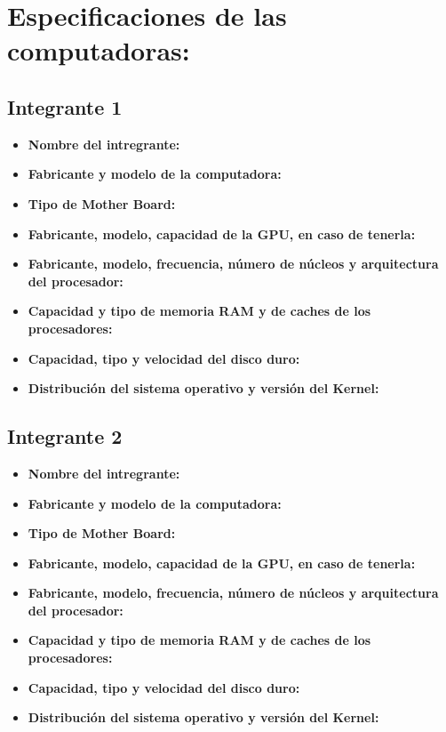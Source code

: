 \documentclass[12pt]{article}
\newcommand{\pl}[1]{\item \textbf{ #1 }}
\begin{document}

%

\section{Especificaciones de las computadoras:}
\subsection{Integrante 1}
\begin{itemize}
    \pl{Nombre del intregrante:}

    \pl{Fabricante y modelo de la computadora:}

    \pl{Tipo de Mother Board:}

    \pl{Fabricante, modelo, capacidad de la GPU, en caso de tenerla:}

    \pl{Fabricante, modelo, frecuencia, número de núcleos y arquitectura del procesador:}

    \pl{Capacidad y tipo de memoria RAM y de caches de los procesadores:}

    \pl{Capacidad, tipo y velocidad del disco duro:}

    \pl{Distribución del sistema operativo y versión del Kernel:}
\end{itemize}


\subsection{Integrante 2}
\begin{itemize}
    \pl{Nombre del intregrante:}

    \pl{Fabricante y modelo de la computadora:}

    \pl{Tipo de Mother Board:}

    \pl{Fabricante, modelo, capacidad de la GPU, en caso de tenerla:}

    \pl{Fabricante, modelo, frecuencia, número de núcleos y arquitectura del procesador:}

    \pl{Capacidad y tipo de memoria RAM y de caches de los procesadores:}

    \pl{Capacidad, tipo y velocidad del disco duro:}

    \pl{Distribución del sistema operativo y versión del Kernel:}
\end{itemize}
\end{document}
